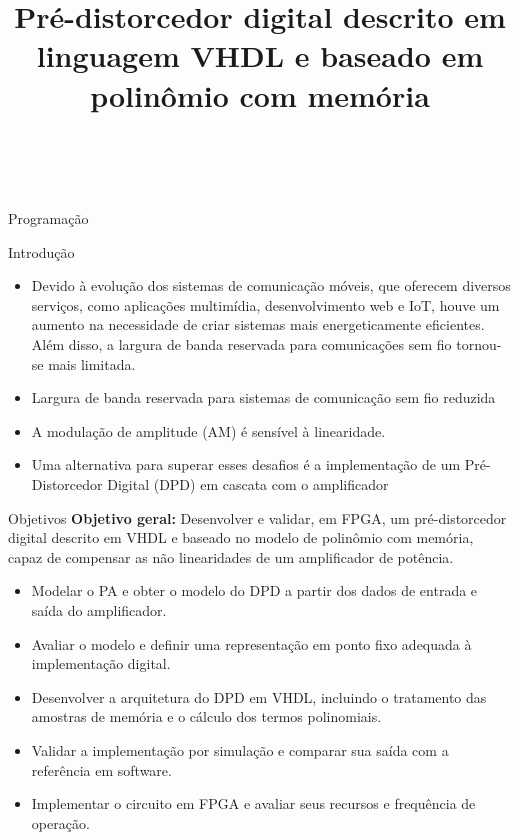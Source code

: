 \documentclass{if-beamer}
\title[Pré-distorcedor digital descrito em linguagem VHDL e baseado em polinômio com memória.]{\textbf{Pré-distorcedor digital descrito em linguagem VHDL e baseado em polinômio com memória}}
\subtitle{}
\author[Leonardo de Andrade Santos]{\large \negrito{Leonardo de Andrade Santos} \\ \negrito{Sibilla Batista da Luz França}}
\institute[UFPR/PR]{
    \small \textit{Universidade Federal do Paraná} \\
}
\date{\the\year}
\begin{document}
\begin{frame}
  \titlepage
\end{frame}

\begin{frame}{Programação}
  \tableofcontents
\end{frame}

\begin{frame}{Introdução}
\begin{itemize}
	\item Devido à evolução dos sistemas de comunicação móveis, que oferecem diversos serviços, como aplicações multimídia, desenvolvimento web e IoT, houve um aumento na necessidade de criar sistemas mais energeticamente eficientes. Além disso, a largura de banda reservada para comunicações sem fio tornou-se mais limitada.
	\item Largura de banda reservada para sistemas de comunicação sem fio reduzida
	\item A modulação de amplitude (AM) é sensível à linearidade.
	\item Uma alternativa para superar esses desafios é a implementação de um Pré-Distorcedor Digital (DPD) em cascata com o amplificador
\end{itemize}
\end{frame}

\begin{frame}{Objetivos}
	\textbf{Objetivo geral:} Desenvolver e validar, em FPGA, um pré-distorcedor digital descrito em VHDL e baseado no modelo de polinômio com memória, capaz de compensar as não linearidades de um amplificador de potência.
	\begin{itemize}
		\item Modelar o PA e obter o modelo do DPD a partir dos dados de entrada e saída do amplificador.
		\item Avaliar o modelo e definir uma representação em ponto fixo adequada à implementação digital.
		\item Desenvolver a arquitetura do DPD em VHDL, incluindo o tratamento das amostras de memória e o cálculo dos termos polinomiais.
		\item Validar a implementação por simulação e comparar sua saída com a referência em software.
		\item Implementar o circuito em FPGA e avaliar seus recursos e frequência de operação.
	\end{itemize}
\end{frame}

\end{document}

